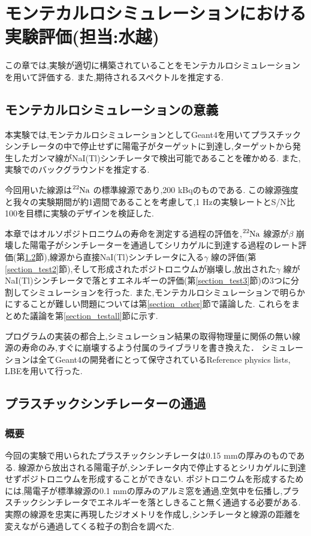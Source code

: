 \chapter{モンテカルロシミュレーションにおける実験評価(担当:水越)}\label{simulation}

この章では,実験が適切に構築されていることをモンテカルロシミュレーションを用いて評価する.
また,期待されるスペクトルを推定する.

\section{モンテカルロシミュレーションの意義}

本実験では,モンテカルロシミュレーションとしてGeant4\cite{geant4}を用いてプラスチックシンチレータの中で停止せずに陽電子がターゲットに到達し,ターゲットから発生したガンマ線がNaI(Tl)シンチレータで検出可能であることを確かめる.
また,実験でのバックグラウンドを推定する.

今回用いた線源は$\ce{^{22}Na}$ の標準線源であり,200 kBqのものである.
この線源強度と我々の実験期間が約1週間であることを考慮して,1 Hzの実験レートとS/N比100を目標に実験のデザインを検証した.


本章ではオルソポジトロニウムの寿命を測定する過程の評価を,$\ce{^{22}Na}$ 線源が$\beta$ 崩壊した陽電子がシンチレーターを通過してシリカゲルに到達する過程のレート評価(第\ref{section_test1}節),線源から直接NaI(Tl)シンチレータに入る$\gamma$ 線の評価(第\ref{section_test2}節),そして形成されたポジトロニウムが崩壊し,放出された$\gamma$ 線がNaI(Tl)シンチレータで落とすエネルギーの評価(第\ref{section_test3}節)の3つに分割してシミュレーションを行った.
また,モンテカルロシミュレーションで明らかにすることが難しい問題については第\ref{section_other}節で議論した.
これらをまとめた議論を第\ref{section_testall}節に示す.

プログラムの実装の都合上,シミュレーション結果の取得物理量に関係の無い線源の寿命のみ,すぐに崩壊するよう付属のライブラリを書き換えた．
シミュレーションは全てGeant4の開発者にとって保守されているReference physics lists, LBEを用いて行った.

\section{プラスチックシンチレーターの通過}
\label{section_test1}

\subsection{概要}
今回の実験で用いられたプラスチックシンチレータは0.15 mmの厚みのものである.
線源から放出される陽電子が,シンチレータ内で停止するとシリカゲルに到達せずポジトロニウムを形成することができない.
ポジトロニウムを形成するためには,陽電子が標準線源の0.1 mmの厚みのアルミ窓を通過,空気中を伝播し,プラスチックシンチレータでエネルギーを落としきること無く通過する必要がある.
実際の線源を忠実に再現したジオメトリを作成し,シンチレータと線源の距離を変えながら通過してくる粒子の割合を調べた.



